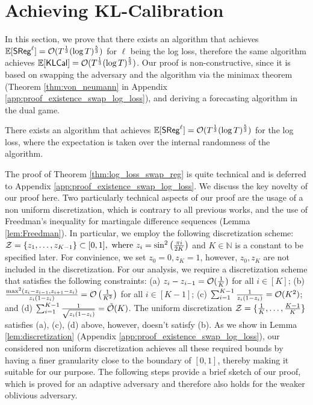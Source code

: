 \section{Achieving KL-Calibration}\label{sec:achieve-KL-Cal}
In this section, we prove that there exists an algorithm that achieves $\mathbb{E}[\mathsf{SReg}^{\ell}] = \mathcal{O}(T^{\frac{1}{3}} (\log T) ^ {\frac{5}{3}})$ for $\ell$ being the log loss, therefore the same algorithm achieves $\mathbb{E}[\mathsf{KLCal}] = \mathcal{O}(T^{\frac{1}{3}} (\log T) ^ {\frac{5}{3}})$. Our proof is non-constructive, since it is based on swapping the adversary and the algorithm via the minimax theorem (Theorem \ref{thm:von_neumann} in Appendix \ref{app:proof_existence_swap_log_loss}), and deriving a forecasting algorithm in the dual game.


\begin{theorem}\label{thm:log_loss_swap_reg}
    There exists an algorithm that achieves $\mathbb{E}[\mathsf{SReg}^{\ell}] = \mathcal{O}(T^{\frac{1}{3}} (\log T) ^ {\frac{5}{3}})$ for the log loss, where the expectation is taken over the internal randomness of the algorithm.
\end{theorem}

The proof of Theorem \ref{thm:log_loss_swap_reg} is quite technical and is deferred to Appendix \ref{app:proof_existence_swap_log_loss}. We discuss the key novelty of our proof here. Two particularly technical aspects of our proof are the usage of a non uniform discretization, which is contrary to all previous works, and the use of Freedman's inequality for martingale difference sequences (Lemma \ref{lem:Freedman}). In particular, we employ the following discretization scheme: $\mathcal{Z} = \{z_{1}, \dots, z_{K - 1}\} \subset [0,1], \text{ where } z_{i} = \sin ^ {2} \left( \frac{\pi i}{2K} \right)$ and $K \in \mathbb{N}$ is a constant to be specified later. For convinience, we set $z_{0} = 0, z_{K} = 1$,
however, $z_{0}, z_{K}$ are not included in the discretization. For our analysis, we require a discretization scheme that satisfies the following constraints: (a) $z_{i} - z_{i - 1} = \mathcal{O}(\frac{1}{K})$ for all $i \in [K]$; (b) $\frac{\max ^ {2}(z_{i} - z_{i - 1}, z_{i + 1} - z_{i})}{z_{i}(1 - z_{i})} = \mathcal{O}\left( \frac{1}{K^{2}} \right)$ for all $i \in [K - 1]$; (c) $\sum_{i = 1} ^ {K - 1} \frac{1}{z_{i}(1 - z_{i})} = \mathcal{O}(K^{2})$; and (d) $\sum_{i = 1} ^ {K - 1} \frac{1}{\sqrt{z_{i}(1 - z_{i})}} = \tilde{\mathcal{O}}(K)$. The uniform discretization $\mathcal{Z} = \{\frac{1}{K}, \dots, \frac{K - 1}{K}\}$ satisfies {(a), (c), (d)} above, however, doesn't satisfy (b).
As we show in Lemma \ref{lem:discretization} (Appendix \ref{app:proof_existence_swap_log_loss}), our considered non uniform discretization achieves all these required bounds by having a finer granularity close to the boundary of $[0,1]$, thereby making it suitable for our purpose.
The following steps provide a brief sketch of our proof, which is proved for an adaptive adversary and therefore also holds for the weaker oblivious adversary.



